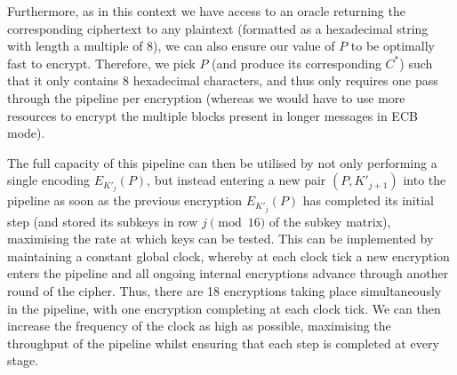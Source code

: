 \documentclass[a4paper, 11pt]{article}
\begin{document}
Furthermore, as in this context we have access to an oracle returning the corresponding ciphertext to any plaintext (formatted as a hexadecimal string with length a multiple of 8), we can also ensure our value of $P$ to be optimally fast to encrypt. Therefore, we pick $P$ (and produce its corresponding $C^{*}$) such that it only contains 8 hexadecimal characters, and thus only requires one pass through the pipeline per encryption (whereas we would have to use more resources to encrypt the multiple blocks present in longer messages in ECB mode).

The full capacity of this pipeline can then be utilised by not only performing a single encoding $E_{K'_{j}}(P)$, but instead entering a new pair $(P, K'_{j+1})$ into the pipeline as soon as the previous encryption $E_{K'_{j}}(P)$ has completed its initial step (and stored its subkeys in row $j \pmod{16}$ of the subkey matrix), maximising the rate at which keys can be tested. This can be implemented by maintaining a constant global clock, whereby at each clock tick a new encryption enters the pipeline and all ongoing internal encryptions advance through another round of the cipher. Thus, there are 18 encryptions taking place simultaneously in the pipeline, with one encryption completing at each clock tick. We can then increase the frequency of the clock as high as possible, maximising the throughput of the pipeline whilst ensuring that each step is completed at every stage.
\end{document}
